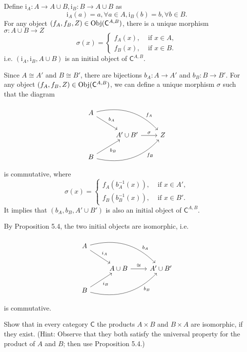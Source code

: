 \begin{solution}
Define $\text{i}_A: A\to A\cup B, \text{i}_B: B\to A\cup B$ as 
$$\text{i}_A(a)=a, \forall a\in A, \text{i}_B(b)=b, \forall b\in B.$$
For any object $(f_A, f_B, Z)\in \mathrm{Obj}(\mathsf{C}^{A,B})$, there is a unique morphism $\sigma : A\cup B \to Z$
$$\sigma(x)=\begin{cases}
f_A(x), &\text{ if } x\in A,\\
f_B(x), &\text{ if } x\in B.
\end{cases}$$
i.e. $(\text{i}_A, \text{i}_B, A\cup B)$ is an initial object of $\mathsf{C}^{A,B}$. 

Since $A\cong A'$ and $B\cong B'$, there are bijections $b_A: A\to A'$ and $b_B: B\to B'$. For any object
$(f_A, f_B, Z)\in \mathrm{Obj}(\mathsf{C}^{A,B})$, we can define a unique morphism $\sigma$ such that the diagram

%
\[
\begin{tikzcd}
A\arrow[dr, "b_A"] \arrow[drr, bend left, "f_A" near end]&&\\
& A'\cup B' \arrow[r, "\sigma"] & Z\\
B\arrow[ur, "b_B"']\arrow[urr, bend right, "f_B"' near end]&&
\end{tikzcd}
\]
is commutative, where 
$$\sigma(x)=\begin{cases}
f_A(b_A^{-1}(x)), &\text{ if } x\in A',\\
f_B(b_B^{-1}(x)), &\text{ if } x\in B'.
\end{cases}$$
It implies that $(b_A, b_B, A'\cup B')$ is also an initial object of $\mathsf{C}^{A,B}$. 

By Proposition 5.4, the two initial objects are isomorphic, i.e.

\[
\begin{tikzcd}
A\arrow[dr, "i_A"] \arrow[drr, bend left, "b_A" near end]&&\\
& A\cup B \arrow[r, "\cong"] & A'\cup B'\\
B\arrow[ur, "i_B"']\arrow[urr, bend right, "b_B"' near end]&&
\end{tikzcd}
\]
is commutative.
\end{solution}

\begin{problem}[5.8]
  Show that in every category $\mathsf{C}$ the products $A\times B$ and $B\times A$ are
  isomorphic, if they exist. (Hint: Observe that they both satisfy the universal
  property for the product of $A$ and $B$; then use Proposition 5.4.)
\end{problem}

